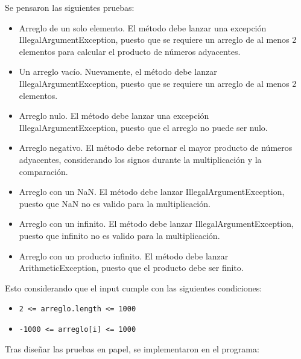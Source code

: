 \documentclass{article}
\begin{document}
Se pensaron las siguientes pruebas:
\begin{itemize}
    \item Arreglo de un solo elemento. El método debe lanzar una excepción IllegalArgumentException, puesto que se requiere un arreglo de al menos 2 elementos para calcular el producto de números adyacentes.
    \item Un arreglo vacío. Nuevamente, el método debe lanzar IllegalArgumentException, puesto que se requiere un arreglo de al menos 2 elementos.
    \item Arreglo nulo. El método debe lanzar una excepción IllegalArgumentException, puesto que el arreglo no puede ser nulo.
    \item Arreglo negativo. El método debe retornar el mayor producto de números adyacentes, considerando los signos durante la multiplicación y la comparación.
    \item Arreglo con un NaN. El método debe lanzar IllegalArgumentException, puesto que NaN no es valido para la multiplicación.
    \item Arreglo con un infinito. El método debe lanzar IllegalArgumentException, puesto que infinito no es valido para la multiplicación.
    \item Arreglo con un producto infinito. El método debe lanzar ArithmeticException, puesto que el producto debe ser finito.
\end{itemize}
Esto considerando que el input cumple con las siguientes condiciones:
\begin{itemize}
    \item \texttt{2 <= arreglo.length <= 1000}
    \item \texttt{-1000 <= arreglo[i] <= 1000}
\end{itemize}
Tras diseñar las pruebas en papel, se implementaron en el programa:
\end{document}
